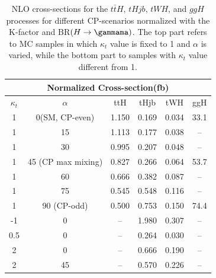 \begin{table}
  \centering
  \begin{tabular}{|c|c||c|c|c|c|}
    \hline
    \multicolumn{6}{|c|}{Normalized Cross-section(fb)} \\
    \hline \hline
    $\kappa_t$ & $\alpha$ & ttH & tHjb & tWH & ggH\\
    \hline
    1 & 0(SM, CP-even)  & 1.150 & 0.169 & 0.034 & 33.1 \\
    1 & 15              & 1.113 & 0.177 & 0.038 & -- \\
    1 & 30              & 0.995 & 0.207 & 0.048 & -- \\
    1 & 45 (CP max mixing)      & 0.827 & 0.266 & 0.064 & 53.7 \\
    1 & 60              & 0.666 & 0.382 & 0.087 & -- \\
    1 & 75              & 0.545 & 0.548 & 0.116 & -- \\
    1 & 90 (CP-odd)     & 0.500 & 0.753 & 0.150 & 74.4 \\
    \hline \hline
    -1 & 0    & -- & 1.980 & 0.307 & -- \\
    0.5 & 0   & -- & 0.264 & 0.030 & -- \\
    2 & 0     & -- & 0.666 & 0.190 & -- \\
    2 & 45    & -- & 0.570 & 0.226 & -- \\
    \hline
  \end{tabular}
  \caption{NLO cross-sections for the $t\bar{t}H$, $tHjb$, $tWH$, and $ggH$ processes for different CP-scenarios normalized with the K-factor and BR$(H\rightarrow\gammama)$. The top part refers to MC samples in which $\kappa_{t}$ value is fixed to 1 and $\alpha$ is varied, while the bottom part to samples with $\kappa_{t}$ value different from 1.}
  \label{tab:MCsamples_XS_norm}
\end{table}
